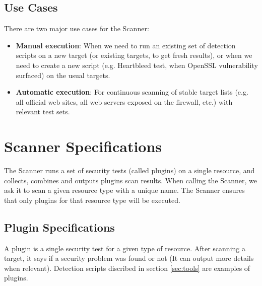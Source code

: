 \subsection{Use Cases}
There are two major use cases for the Scanner:
\begin{itemize}
\item \textbf{Manual execution}: When we need to run an existing set of detection scripts on a new target (or existing targets, to get fresh results), or when we need to create a new script (e.g. Heartbleed test, when OpenSSL vulnerability surfaced) on the usual targets.
\item \textbf{Automatic execution}: For continuous scanning of stable target lists (e.g. all official web sites, all web servers exposed on the firewall, etc.) with relevant test sets.
\end{itemize}

\section{Scanner Specifications}
The Scanner runs a set of security tests (called plugins) on a single resource, and collects, combines and outputs plugins scan results. When calling the Scanner, we ask it to scan a given resource type with a unique name. The Scanner ensures that only plugins for that resource type will be executed. 

\subsection{Plugin Specifications}
A plugin is a single security test for a given type of resource. After scanning a target, it says if a security problem was found or not (It can output more details when relevant). Detection scripts discribed in section \ref{sec:tools} are examples of plugins.
